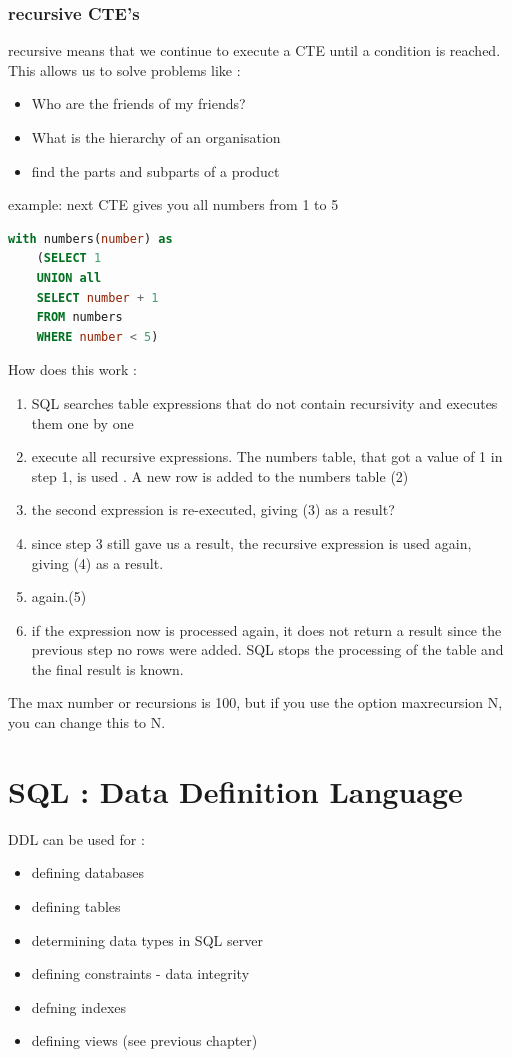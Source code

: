\documentclass{report}
\begin{document}
	\subsection{recursive CTE's}
	recursive means that we continue to execute a CTE until a condition is reached.
	This allows us to solve problems like : 
	\begin{itemize}
		\item Who are the friends of my friends?
		\item What is the hierarchy of an organisation
		\item find the parts and subparts of a product
	\end{itemize}
	example: next CTE gives you all numbers from 1 to 5
	\begin{lstlisting}[language=sql]
	with numbers(number) as 
	(SELECT 1
	UNION all
	SELECT number + 1
	FROM numbers
	WHERE number < 5)\end{lstlisting}
	How does this work : 
	\begin{enumerate}
		\item SQL searches table expressions that do not contain recursivity and executes them one by one
		\item execute all recursive expressions. The numbers table, that got a value of 1 in step 1, is used . A new row is added to the numbers table (2)
		\item the second expression is re-executed, giving (3) as a result?
		\item since step 3 still gave us a result, the recursive expression is used again, giving (4) as a result. 
		\item again.(5)
		\item if the expression now is processed again, it does not return a result since the previous step no rows were added. SQL stops the processing of the table and the final result is known.
	\end{enumerate}
	The max number or recursions is 100, but if you use the option maxrecursion N, you can change this to N. 
	
	\chapter{SQL : Data Definition Language}
	DDL can be used for : 
	\begin{itemize}
		\item defining databases
		\item defining tables
		\item determining data types in SQL server
		\item defining constraints - data integrity
		\item defning indexes 
		\item defining views (see previous chapter)
	\end{itemize}
	
\end{document}
